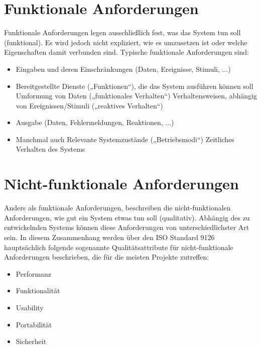 \cite{partsch-re}

\section{Funktionale Anforderungen}
Funktionale Anforderungen legen ausschließlich fest, was das System tun soll (funktional). Es wird jedoch nicht expliziert, wie es umzusetzen ist oder welche Eigenschaften damit verbunden sind. Typische funktionale Anforderungen sind:
\begin{itemize}
	\item Eingaben und deren Einschränkungen (Daten, Ereignisse, Stimuli, ...)
	\item Bereitgestellte Dienste („Funktionen“), die das System ausführen können soll
	\subitem Umformung von Daten („funktionales Verhalten“)
	\subitem Verhaltensweisen, abhängig von Ereignissen/Stimuli („reaktives Verhalten“)
	\item Ausgabe (Daten, Fehlermeldungen, Reaktionen, ...)
	\item 	Manchmal auch
	\subitem Relevante Systemzustände („Betriebsmodi“)
	\subitem Zeitliches Verhalten des Systems
\end{itemize}

\cite{partsch-re}

\section{Nicht-funktionale Anforderungen}
Anders als funktionale Anforderungen, beschreiben die nicht-funktionalen Anforderungen, wie gut ein System etwas tun soll (qualitativ). Abhängig des zu entwickelnden Systems können diese Anforderungen von unterschiedlichster Art sein. In diesem Zusammenhang werden über den ISO Standard 9126 hauptsächlich folgende sogenannte Qualitätsattribute für nicht-funktionale Anforderungen beschrieben, die für die meisten Projekte zutreffen:

\begin{itemize}
	\item Performanz
	\item Funktionalität
	\item Usability
	\item Portabilität
	\item Sicherheit
\end{itemize}

\cite{fraunhofer}

